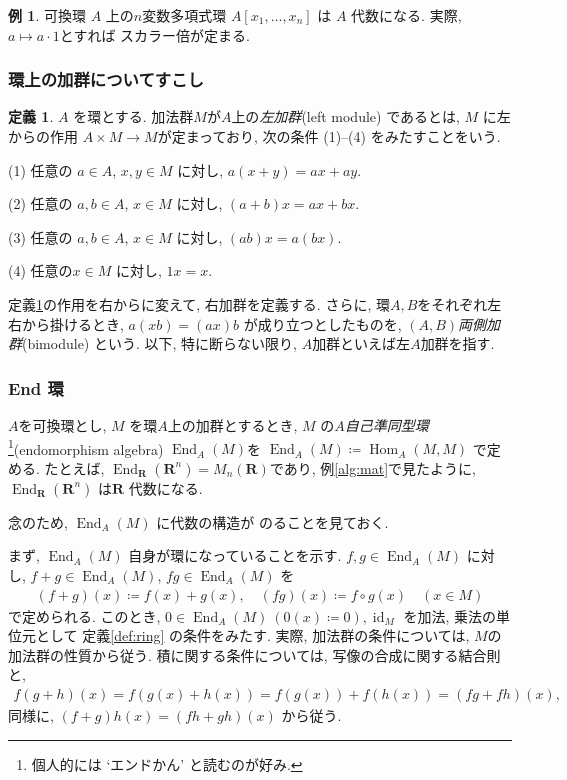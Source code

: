 \documentclass[11pt, a4paper, dvipdfmx]{jsarticle}
\theoremstyle{definition}
\newtheorem{Definition}[Axiom]{定義}
\newtheorem{Example}[Axiom]{例}
\newcommand{\rr}{\mathbf{R}}
\newcommand{\id}{\mathop{\mathrm{id}}\nolimits} %
\newcommand{\Hom}{\mathop{\mathrm{Hom}}\nolimits}
\newcommand{\End}{\mathop{\mathrm{End}}\nolimits}
\numberwithin{equation}{section}
\begin{document}
\begin{Example}
    可換環 $A$ 上の$n$変数多項式環
    $A[x_1,\ldots,x_n]$
    は $A$ 代数になる. 実際, 
    $a \mapsto a \cdot 1$とすれば
    スカラー倍が定まる. 
\end{Example}

\subsubsection*{環上の加群についてすこし}

\begin{Definition}\label{def:modules}
    $A$ を環とする. 加法群$M$が$A$上の\emph{左加群}(left module) 
    であるとは, 
    $M$ に左からの作用 $A\times M\to M$が定まっており, 
    次の条件 (1)--(4) をみたすことをいう. 

    (1) 
    任意の $a\in A$, $x,y\in M$ に対し, 
    $a(x+y) = ax + ay$. 

    (2) 
    任意の $a,b\in A$, $x\in M$ に対し, 
    $(a+b)x = ax + bx$. 

    (3) 
    任意の $a,b\in A$, $x\in M$ に対し, 
    $(ab)x = a(bx)$. 

    (4) 
    任意の$x\in M$ に対し, $1x=x$. 
\end{Definition}

定義\ref{def:modules}の作用を右からに変えて, 
右加群を定義する. 
さらに, 環$A,B$をそれぞれ左右から掛けるとき, 
$a(xb) = (ax)b$
が成り立つとしたものを, 
$(A,B)$\emph{両側加群}(bimodule) という. 
以下, 特に断らない限り, $A$加群といえば左$A$加群を指す. 

\subsubsection*{End 環}

$A$を可換環とし, 
$M$ を環$A$上の加群とするとき, 
$M$ の$A$\emph{自己準同型環}\footnote{
    個人的には `エンドかん' と読むのが好み.
}(endomorphism algebra) $\End_A(M)$を
$\End_A(M) \coloneqq \Hom_A(M,M)$
で定める. 
たとえば, $\End_\rr(\rr^n) = M_n(\rr)$であり, 
例\ref{alg:mat}で見たように, 
$\End_\rr(\rr^n)$ は$\rr$ 代数になる. 

念のため, $\End_A(M)$ に代数の構造が
のることを見ておく. 

まず, $\End_A(M)$ 自身が環になっていることを示す. 
$f,g\in\End_A(M)$ に対し, 
$f+g\in\End_A(M)$, $fg\in\End_A(M)$ を
\begin{align*}
    (f+g)(x) \coloneqq f(x)+ g(x), \quad 
    (fg)(x)\coloneqq f\circ g(x) \quad (x\in M)
\end{align*}
で定められる. このとき, 
$0\in \End_A(M)\ (0(x)\coloneqq 0), \id_M$
を加法, 乗法の単位元として
定義\ref{def:ring} の条件をみたす. 実際, 
加法群の条件については, $M$の加法群の性質から従う. 
積に関する条件については, 
写像の合成に関する結合則と, 
\begin{align*}
    f(g+h)(x) = f(g(x)+h(x)) 
    = f(g(x)) + f(h(x)) = (fg + fh)(x), 
\end{align*}
同様に, 
$(f+g)h(x) = (fh + gh)(x)$
から従う. 
\end{document}
